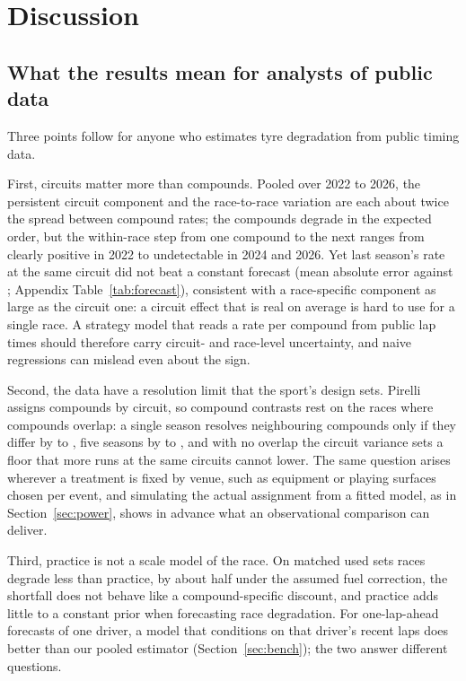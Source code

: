 \section{Discussion}\label{sec:discussion}

\subsection{What the results mean for analysts of public data}

Three points follow for anyone who estimates tyre degradation from public timing data.

First, circuits matter more than compounds.
Pooled over 2022 to 2026, the persistent circuit component and the race-to-race variation are each about twice the spread between compound rates; the compounds degrade in the expected order, but the within-race step from one compound to the next ranges from clearly positive in 2022 to undetectable in 2024 and 2026.
Yet last season's rate at the same circuit did not beat a constant forecast (mean absolute error \MaeHistory\spl{} against \MaeConstant\spl; Appendix Table~\ref{tab:forecast}), consistent with a race-specific component as large as the circuit one: a circuit effect that is real on average is hard to use for a single race.
A strategy model that reads a rate per compound from public lap times should therefore carry circuit- and race-level uncertainty, and naive regressions can mislead even about the sign.

Second, the data have a resolution limit that the sport's design sets.
Pirelli assigns compounds by circuit, so compound contrasts rest on the races where compounds overlap: a single season resolves neighbouring compounds only if they differ by \SixMDEFourThree{} to \SixMDETwoOne\spl, five seasons by \PoolMDEFourThree{} to \PoolMDETwoOne\spl, and with no overlap the circuit variance sets a floor that more runs at the same circuits cannot lower.
The same question arises wherever a treatment is fixed by venue, such as equipment or playing surfaces chosen per event, and simulating the actual assignment from a fitted model, as in Section~\ref{sec:power}, shows in advance what an observational comparison can deliver.

Third, practice is not a scale model of the race.
On matched used sets races degrade less than practice, by about half under the assumed fuel correction, the shortfall does not behave like a compound-specific discount, and practice adds little to a constant prior when forecasting race degradation.
For one-lap-ahead forecasts of one driver, a model that conditions on that driver's recent laps does better than our pooled estimator (Section~\ref{sec:bench}); the two answer different questions.

